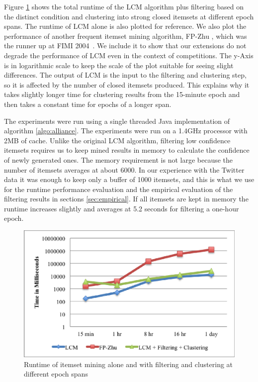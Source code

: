 \documentclass[letterpaper,12pt,titlepage,oneside,final]{book}
\begin{document}
Figure \ref{fig:lcmvsfpzhu} shows the total runtime of the LCM algorithm plus
filtering based on the distinct condition and clustering into strong closed
itemsets at different epoch spans.
The runtime of LCM alone is also plotted for reference.
We also plot the performance of another frequent itemset mining algorithm,
FP-Zhu \cite{grahne2004reducing}, which was the runner up at
FIMI 2004~\cite{DBLP:conf/fimi/2004}.
We include it to show that our extensions do not degrade the performance of
LCM even in the context of competitions.
The y-Axis is in logarithmic scale to keep the scale of the plot suitable for
seeing slight differences.
The output of LCM is the input to the filtering and clustering step,
so it is affected by the number of closed itemsets produced.
This explains why it takes slightly longer time for clustering results from
the 15-minute epoch and then takes a constant time for epochs of a longer span. 

The experiments were run using a single threaded Java implementation of
algorithm \ref{algo:alliance}.
The experiments were run on a 1.4GHz processor with 2MB of cache.
Unlike the original LCM algorithm, filtering low confidence itemsets requires
us to keep mined results in memory to calculate the confidence of newly
generated ones.
The memory requirement is not large because the number of itemsets averages
at about 6000.
In our experience with the Twitter data it was enough to keep only a buffer
of 1000 itemsets, and this is what we use for the runtime performance
evaluation and the empirical evaluation of the filtering results in
sections \ref{sec:empirical}.
If all itemsets are kept in memory the runtime increases slightly and
averages at 5.2 seconds for filtering a one-hour epoch.



\begin{figure}
\centering
\includegraphics{runtime_lcm-lcm+filter-fpzhu_seconds.eps}
\caption{Runtime of itemset mining alone and with filtering and clustering at different epoch spans}
\label{fig:lcmvsfpzhu}
\end{figure}
\end{document}
